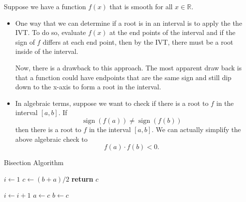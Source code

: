 \documentclass[a4paper,12pt]{article}
\newcommand{\reals}{\mathbb{R}}
\DeclareMathOperator{\sign}{sign}
\begin{document}
Suppose we have a function $f(x)$ that is smooth for all $x \in \reals$.
\begin{itemize}
    \item One way that we can determine if a root is in an interval is to apply the the IVT. To do so, evaluate $f(x)$ at the end points of the interval and if the sign of $f$ differs at each end point, then by the IVT, there must be a root inside of the interval. 
    
    Now, there is a drawback to this approach. The most apparent draw back is that a function could have endpoints that are the same sign and still dip down to the x-axis to form a root in the interval.
    
    \item In algebraic terms, suppose we want to check if there is a root to $f$ in the interval $[a, b]$. If
    \[
        \sign(f(a)) \neq \sign(f(b))
    \]
    then there is a root to $f$ in the interval $[a, b]$. We can actually simplify the above algebraic check to 
    \[
        f(a) \cdot f(b) < 0.
    \]
\end{itemize}

\begin{algorithm}
    \caption{Bisection Algorithm}
    \begin{algorithmic}[1]
        \State $i \gets 1$
            \State $c \gets (b + a) / 2$ 
                \State \textbf{return} $c$ 
            \EndIf
            
            \State $i \gets i + 1$
            \If{$\sign(f(c)) = \sign(f(a))$}
                \State $a \gets c$ 
            \Else
                \State $b \gets c$ 
            \EndIf
        \EndWhile
    \EndProcedure
    \end{algorithmic}
\end{algorithm}
\end{document}
